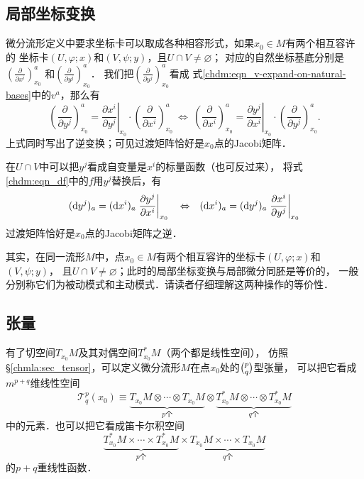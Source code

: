 \subsection{局部坐标变换}\label{chdm:sec_coortrans}
微分流形定义中要求坐标卡可以取成各种相容形式，如果$x_0\in M$有两个相互容许的
坐标卡$(U,\varphi;x)$和$(V,\psi;y)$，且$U\cap V \neq \varnothing$；
对应的自然坐标基底分别是$(\frac{\partial }{\partial x^i})^a_{x_0} $
和$(\frac{\partial }{\partial y^j})^a_{x_0} $．
我们把$(\frac{\partial }{\partial y^j})^a_{x_0} $看成
式\eqref{chdm:eqn_v-expand-on-natural-bases}中的$v^a$，那么有
\begin{equation}\label{chdm:eqn_xy-transform}
    \left(\frac{\partial }{\partial y^j}\right)^a_{x_0} = \left. \frac{\partial x^i}{\partial y^j}\right|_{x_0} \cdot
    \left(\frac{\partial }{\partial x^i}\right)^a_{x_0}     {\ \Leftrightarrow \ }
    \left(\frac{\partial }{\partial x^i}\right)^a_{x_0} = \left. \frac{\partial y^j}{\partial x^i}\right|_{x_0} \cdot
    \left(\frac{\partial }{\partial y^j}\right)^a_{x_0} .
\end{equation}
上式同时写出了逆变换；可见过渡矩阵恰好是$x_0$点的Jacobi矩阵．


在$U\cap V$中可以把$y^j$看成自变量是$x^i$的标量函数（也可反过来），
将式\eqref{chdm:eqn_df}中的$f$用$y^j$替换后，有
\begin{equation}\label{chdm:eqn_xy-cov-transform}
    ({\rm d}y^j)_a = ({\rm d}x^i)_a \left.\frac{\partial y^j}{\partial x^i}\right|_{x_0} 
    {\quad \Leftrightarrow \quad }
    ({\rm d}x^i)_a = ({\rm d}y^j)_a \left.\frac{\partial x^i}{\partial y^j}\right|_{x_0} 
\end{equation}
过渡矩阵恰好是$x_0$点的Jacobi矩阵之逆．

其实，在同一流形$M$中，点$x_0\in M$有两个相互容许的坐标卡$(U,\varphi;x)$和$(V,\psi;y)$，
且$U\cap V \neq \varnothing$；此时的局部坐标变换与局部微分同胚是等价的，
一般分别称它们为被动模式和主动模式．请读者仔细理解这两种操作的等价性．


\subsection{张量}\label{chdm:sec_tensor-p}
有了切空间$T_{x_0}M$及其对偶空间$T_{x_0}^{*}M$（两个都是线性空间），
仿照\S\ref{chmla:sec_tensor}，可以定义微分流形$M$在点$x_0$处的$\binom{p}{q}$型张量，
可以把它看成$m^{p+q}$维线性空间
\begin{equation}\label{chdm:eqn_TM-TsM}
    \mathcal{T}^p_q(x_0) \equiv \underbrace{T_{x_0}M\otimes \cdots \otimes T_{x_0}M}_{p\text{个}}
    \otimes \underbrace{T_{x_0}^{*}M\otimes \cdots \otimes T_{x_0}^{*}M}_{q\text{个}}
\end{equation}
中的元素．也可以把它看成笛卡尔积空间
\begin{equation}\label{chdm:eqn_TM-X-TsM}
    \underbrace{T_{x_0}^{*}M \times \cdots \times T_{x_0}^{*}M}_{p\text{个}}
    \times \underbrace{T_{x_0}M\times \cdots \times T_{x_0}M}_{q\text{个}}
\end{equation}
的$p+q$重线性函数．

